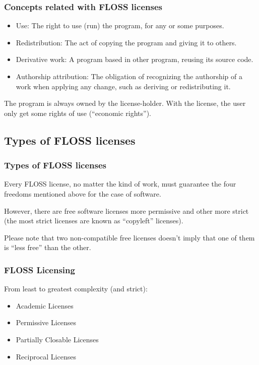 \documentclass{beamer}
\begin{document}
\begin{frame}
\frametitle{Concepts related with FLOSS licenses}

\begin{itemize}
\item \alert{Use}: The right to use (run) the program, for any or some
  purposes.
\item \alert{Redistribution}: The act of copying the program and giving it to
  others.
\item \alert{Derivative work}: A program based in other program, reusing its
  source code.
\item \alert{Authorship attribution}: The obligation of recognizing the
  authorship of a work when applying any change, such as deriving or
  redistributing it.
\end{itemize}

The program is always owned by the license-holder. With the license, the user only get some rights of use (``economic rights'').

\end{frame}


\subsection{Types of FLOSS licenses}
\begin{frame}
\frametitle{Types of FLOSS licenses}
Every \alert{FLOSS license}, no matter the kind of work, must guarantee the \alert{four freedoms} mentioned above for the case of software.\\\pause

\medskip

However, there are free software licenses more permissive and other more strict (the most strict licenses are known as ``copyleft'' licenses). \\\pause

\medskip

Please note that two non-compatible free licenses \alert{doesn't imply} that one of them is ``less free'' than the other. 

\end{frame}



\begin{frame}
\frametitle{FLOSS Licensing}

From least to greatest complexity (and strict):
\begin{itemize}
\item \alert{Academic Licenses}
\item \alert{Permissive Licenses}
\item \alert{Partially Closable Licenses}
\item \alert{Reciprocal Licenses}
\end{itemize}

\end{frame}
\end{document}
